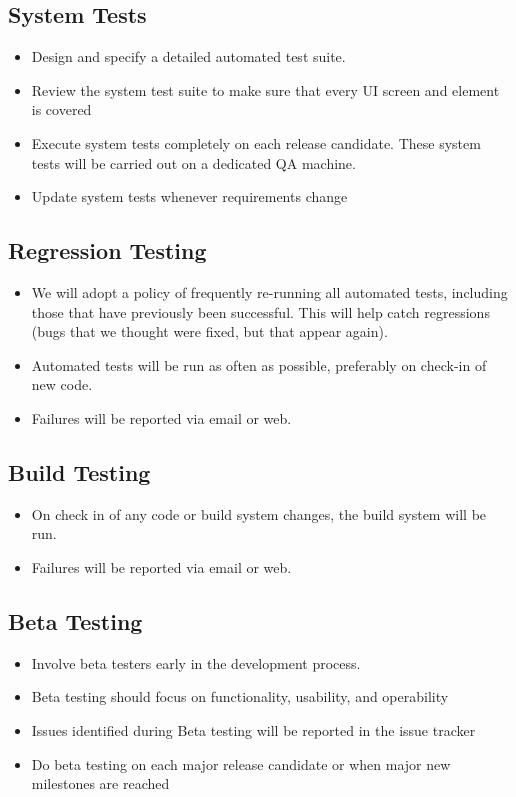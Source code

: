 \documentclass[11pt]{article}
\begin{document}
\subsection{System Tests}

\begin{itemize}
\item Design and specify a detailed automated test suite.
\item Review the system test suite to make sure that every UI screen and element is covered
\item Execute system tests completely on each release candidate. These system tests will be carried out on a dedicated QA machine.
\item Update system tests whenever requirements change
\end{itemize}

\subsection{Regression Testing}

\begin{itemize}
\item We will adopt a policy of frequently re-running all automated tests, including those that have previously been successful. This will help catch regressions (bugs that we thought were fixed, but that appear again).
\item Automated tests will be run as often as possible, preferably on check-in of new code.
\item Failures will be reported via email or web.
\end{itemize}

\subsection{Build Testing}

\begin{itemize}
\item On check in of any code or build system changes, the build system will be run.
\item Failures will be reported via email or web.
\end{itemize}

\subsection{Beta Testing}

\begin{itemize}
\item Involve beta testers early in the development process.
\item Beta testing should focus on functionality, usability, and operability
\item Issues identified during Beta testing will be reported in the issue tracker
\item Do beta testing on each major release candidate or when major new milestones are reached
\end{itemize}
\end{document}
